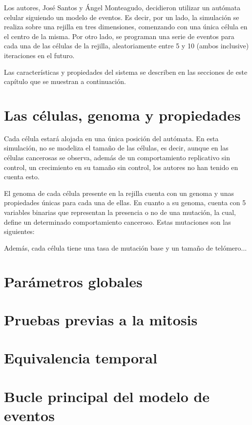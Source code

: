 Los autores, José Santos y Ángel Monteagudo, decidieron utilizar un autómata celular
siguiendo un modelo de eventos. Es decir, por un lado, la simulación se realiza
sobre una rejilla en tres dimensiones, comenzando con una única célula en el centro de la misma.
Por otro lado, se programan una serie de eventos para cada una de las células de la rejilla, aleatoriamente
entre 5 y 10 (ambos inclusive) iteraciones en el futuro.

Las características y propiedades del sistema se describen en las secciones de este capítulo que
se muestran a continuación.

\section{Las células, genoma y propiedades}

Cada célula estará alojada en una única posición del autómata. En esta simulación, no se modeliza
el tamaño de las células, es decir, aunque en las células cancerosas se observa, además de un comportamiento
replicativo sin control, un crecimiento en su tamaño sin control, los autores no han tenido en cuenta esto.

El genoma de cada célula presente en la rejilla cuenta con un genoma y unas propiedades únicas para cada una de ellas.
En cuanto a su genoma, cuenta con 5 variables binarias que representan la presencia o no de una mutación, la cual, define
un determinado comportamiento canceroso. Estas mutaciones son las siguientes:


Además, cada célula tiene una tasa de mutación base y un tamaño de telómero...

\section{Parámetros globales}

\section{Pruebas previas a la mitosis}

\section{Equivalencia temporal}

\section{Bucle principal del modelo de eventos}
